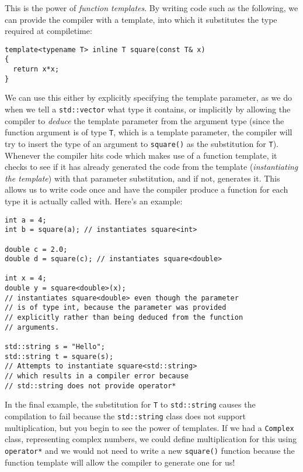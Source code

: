 \documentclass[a4paper]{scrartcl}
\begin{document}
This is the power of \emph{function templates}. By writing code such as the following, we can provide the compiler with a template, into which it substitutes the type required at compiletime:

\begin{verbatim}
template<typename T> inline T square(const T& x)
{
  return x*x;
}
\end{verbatim}

We can use this either by explicitly specifying the template parameter, as we do when we tell a \verb|std::vector| what type it contains, or implicitly by allowing the compiler to \emph{deduce} the template parameter from the argument type (since the function argument is of type \verb|T|, which is a template parameter, the compiler will try to insert the type of an argument to \verb|square()| as the substitution for \verb|T|). Whenever the compiler hits code which makes use of a function template, it checks to see if it has already generated the code from the template (\emph{instantiating the template}) with that parameter substitution, and if not, generates it. This allows us to write code once and have the compiler produce a function for each type it is actually called with. Here's an example:

\begin{verbatim}
int a = 4;
int b = square(a); // instantiates square<int>

double c = 2.0;
double d = square(c); // instantiates square<double>

int x = 4;
double y = square<double>(x);
// instantiates square<double> even though the parameter
// is of type int, because the parameter was provided
// explicitly rather than being deduced from the function
// arguments.

std::string s = "Hello";
std::string t = square(s);
// Attempts to instantiate square<std::string>
// which results in a compiler error because
// std::string does not provide operator*
\end{verbatim}

In the final example, the substitution for \verb|T| to \verb|std::string| causes the compilation to fail because the \verb|std::string| class does not support multiplication, but you begin to see the power of templates. If we had a \verb|Complex| class, representing complex numbers, we could define multiplication for this using \verb|operator*| and we would not need to write a new \verb|square()| function because the function template will allow the compiler to generate one for us!
\end{document}
